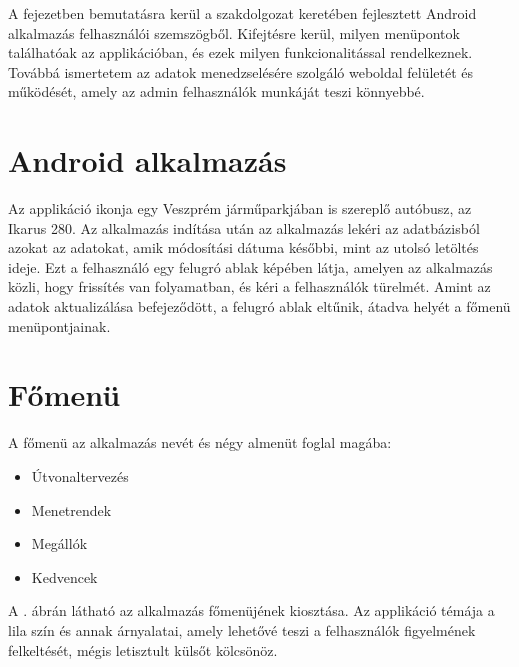 
A fejezetben bemutatásra kerül a szakdolgozat keretében fejlesztett Android alkalmazás felhasználói szemszögből.
Kifejtésre kerül, milyen menüpontok találhatóak az applikációban, és ezek milyen funkcionalitással rendelkeznek.
Továbbá ismertetem az adatok menedzselésére szolgáló weboldal felületét és működését, amely az admin felhasználók munkáját teszi könnyebbé.

\section{Android alkalmazás}
\label{androidapp}
Az applikáció ikonja egy Veszprém járműparkjában is szereplő autóbusz, az Ikarus 280.
Az alkalmazás indítása után az alkalmazás lekéri az adatbázisból azokat az adatokat, amik módosítási dátuma későbbi, mint az utolsó letöltés ideje.
Ezt a felhasználó egy felugró ablak képében látja, amelyen az alkalmazás közli, hogy frissítés van folyamatban, és kéri a felhasználók türelmét.
Amint az adatok aktualizálása befejeződött, a felugró ablak eltűnik, átadva helyét a főmenü menüpontjainak.

\section {Főmenü}
\label {fomenu}
A főmenü az alkalmazás nevét és négy almenüt foglal magába:
\begin{itemize}
	\item Útvonaltervezés
	\item Menetrendek
	\item Megállók
	\item Kedvencek
\end{itemize}

A . ábrán látható az alkalmazás főmenüjének kiosztása. 
Az applikáció témája a lila szín és annak árnyalatai, amely lehetővé teszi a felhasználók figyelmének felkeltését, mégis letisztult külsőt kölcsönöz.

